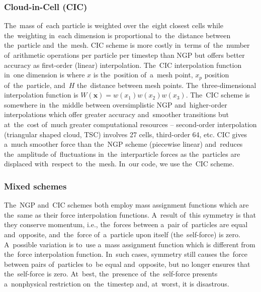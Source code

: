 \subsubsection{Cloud-in-Cell (CIC)}
The~mass of~each particle is weighted over the~eight closest cells while the~weighting in~each dimension is proportional to~the~distance between the~particle and~the~mesh. CIC scheme is more costly in~terms of~the~number of~arithmetic operations per particle per timestep than NGP but offers better accuracy as first-order (linear) interpolation. The~CIC interpolation function in~one dimension is
where $x$ is the~position of~a~mesh point, $x_p$ position of~the~particle, and~$H$ the~distance between mesh points. The~three-dimensional interpolation function is \(W(\mathbf x)=w(x_1)w(x_2)w(x_3)\). The~CIC scheme is somewhere in~the~middle between oversimplistic NGP and~higher-order interpolations which offer greater accuracy and~smoother transitions but at~the~cost of~much greater computational resources -- second-order interpolation (triangular shaped cloud, TSC) involves 27 cells, third-order 64, etc. CIC gives a~much smoother force than the~NGP scheme (piecewise linear) and~reduces the~amplitude of~fluctuations in~the~interparticle forces as the~particles are displaced with~respect to~the~mesh. In~our code, we use the~CIC scheme.
\subsubsection{Mixed schemes}
The~NGP and~CIC schemes both employ mass assignment functions which are the~same as their force interpolation functions. A~result of~this symmetry is that they conserve momentum, i.e., the~forces between a~pair of~particles are equal and~opposite, and~the~force of~a~particle upon itself (the~self-force) is zero. A~possible variation is to~use a~mass assignment function which is different from the~force interpolation function. In~such cases, symmetry still causes the~force between pairs of~particles to~be equal and~opposite, but no longer ensures that the~self-force is zero. At~best, the~presence of~the~self-force presents a~nonphysical restriction on~the~timestep and, at~worst, it is disastrous.

